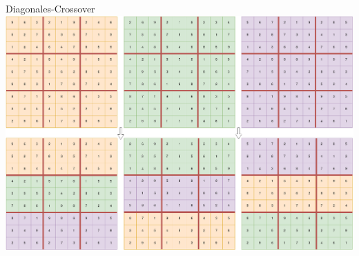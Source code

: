 \begin{frame}{Diagonales-Crossover}
    \centering
    \includegraphics[width=\textwidth]{Pictures/Diagonales-Crossover.png}
\end{frame}
